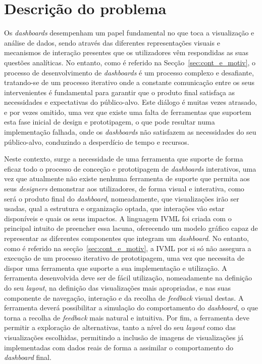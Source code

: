 \section{Descrição do problema}
\label{sec:des_problema}

Os \textit{dashboards} desempenham um papel fundamental no que toca a visualização e análise de dados, sendo através das diferentes representações visuais e mecanismos de interação presentes que os utilizadores vêm respondidas as suas questões analíticas. No entanto, como é referido na Secção~\ref{sec:cont_e_motiv}, o processo de desenvolvimento de \textit{dashboards} é um processo complexo e desafiante, tratando-se de um processo iterativo onde a constante comunicação entre os seus intervenientes é fundamental para garantir que o produto final satisfaça as necessidades e expectativas do público-alvo. Este diálogo é muitas vezes atrasado, e por vezes omitido, uma vez que existe uma falta de ferramentas que suportem esta fase inicial de design e prototipagem, o que pode resultar numa implementação falhada, onde os \textit{dashboards} não satisfazem as necessidades do seu público-alvo, conduzindo a desperdício de tempo e recursos.

Neste contexto, surge a necessidade de uma ferramenta que suporte de forma eficaz todo o processo de conceção e prototipagem de \textit{dashboards} interativos, uma vez que atualmente não existe nenhuma ferramenta de suporte que permita aos seus \textit{designers} demonstrar aos utilizadores, de forma visual e interativa, como será o produto final do \textit{dashboard}, nomeadamente, que visualizações irão ser usadas, qual a estrutura e organização optada, que interações vão estar disponíveis e quais os seus impactos. A linguagem \gls{IVML} foi criada com o principal intuito de preencher essa lacuna, oferecendo um modelo gráfico capaz de representar as diferentes componentes que integram um \textit{dashboard}. No entanto, como é referido na secção~\ref{sec:cont_e_motiv}, a \gls{IVML} por si só não assegura a execução de um processo iterativo de prototipagem, uma vez que necessita de dispor uma ferramenta que suporte a sua implementação e utilização. A ferramenta desenvolvida deve ser de fácil utilização, nomeadamente na definição do seu \textit{layout}, na definição das visualizações mais apropriadas, e nas suas componente de navegação, interação e da recolha de \textit{feedback} visual destas. A ferramenta deverá possibilitar a simulação do comportamento do \textit{dashboard}, o que torna a recolha de \textit{feedback} mais natural e intuitiva. Por fim, a ferramenta deve permitir a exploração de alternativas, tanto a nível do seu \textit{layout} como das visualizações escolhidas, permitindo a inclusão de imagens de visualizações já implementadas com dados reais de forma a assimilar o comportamento do \textit{dashboard} final.

